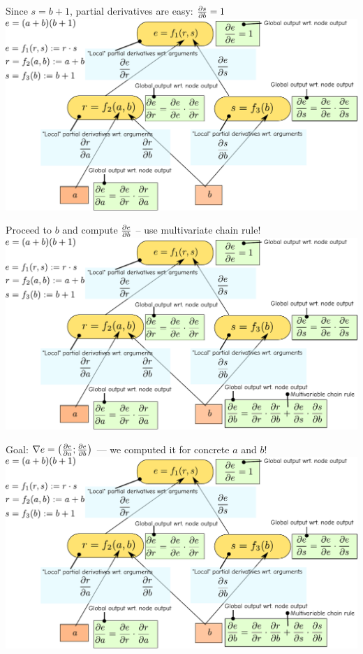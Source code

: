 \documentclass[12pt,aspectratio=169,handout]{beamer}
\begin{document}
\begin{frame}{Since $s = b + 1$, partial derivatives are easy: $\pdv{s}{b} = 1$}
	\includegraphics[width=1.1\linewidth]{img/backprop09.pdf}
\end{frame}

\begin{frame}{Proceed to $b$ and compute $\pdv{e}{b}$ -- use multivariate chain rule!}
	\includegraphics[width=1.1\linewidth]{img/backprop10.pdf}
\end{frame}


\begin{frame}{Goal: $\nabla e = \left( \pdv{e}{a}; \pdv{e}{b} \right)$ --- we computed it for concrete $a$ and $b$!}
	\includegraphics[width=1.1\linewidth]{img/backprop10.pdf}
\end{frame}
\end{document}
